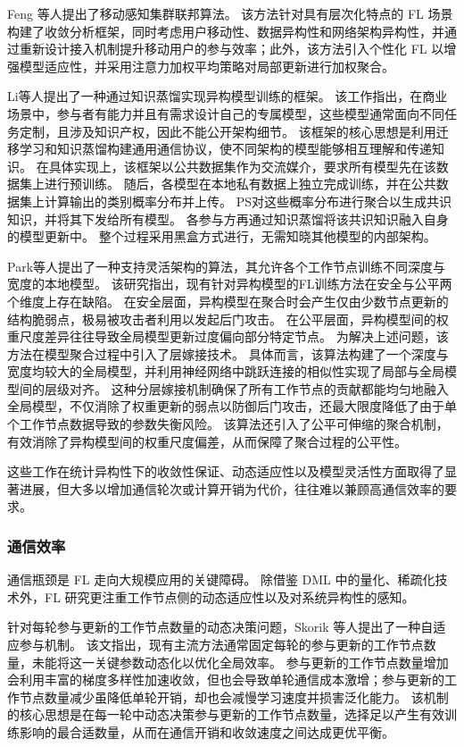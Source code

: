 \documentclass[master, vlined]{DissertUESTC}
\begin{document}
	Feng 等人提出了移动感知集群联邦算法。
	该方法针对具有层次化特点的 FL 场景构建了收敛分析框架，同时考虑用户移动性、数据异构性和网络架构异构性，并通过重新设计接入机制提升移动用户的参与效率；此外，该方法引入个性化 FL 以增强模型适应性，并采用注意力加权平均策略对局部更新进行加权聚合。

	Li等人提出了一种通过知识蒸馏实现异构模型训练的框架。
	该工作指出，在商业场景中，参与者有能力并且有需求设计自己的专属模型，这些模型通常面向不同任务定制，且涉及知识产权，因此不能公开架构细节。
	该框架的核心思想是利用迁移学习和知识蒸馏构建通用通信协议，使不同架构的模型能够相互理解和传递知识。
	在具体实现上，该框架以公共数据集作为交流媒介，要求所有模型先在该数据集上进行预训练。
	随后，各模型在本地私有数据上独立完成训练，并在公共数据集上计算输出的类别概率分布并上传。
	PS对这些概率分布进行聚合以生成共识知识，并将其下发给所有模型。
	各参与方再通过知识蒸馏将该共识知识融入自身的模型更新中。
	整个过程采用黑盒方式进行，无需知晓其他模型的内部架构。

	Park等人提出了一种支持灵活架构的算法，其允许各个工作节点训练不同深度与宽度的本地模型。
	该研究指出，现有针对异构模型的FL训练方法在安全与公平两个维度上存在缺陷。
	在安全层面，异构模型在聚合时会产生仅由少数节点更新的结构脆弱点，极易被攻击者利用以发起后门攻击。
	在公平层面，异构模型间的权重尺度差异往往导致全局模型更新过度偏向部分特定节点。
	为解决上述问题，该方法在模型聚合过程中引入了层嫁接技术。
	具体而言，该算法构建了一个深度与宽度均较大的全局模型，并利用神经网络中跳跃连接的相似性实现了局部与全局模型间的层级对齐。
	这种分层嫁接机制确保了所有工作节点的贡献都能均匀地融入全局模型，不仅消除了权重更新的弱点以防御后门攻击，还最大限度降低了由于单个工作节点数据导致的参数失衡风险。
	该算法还引入了公平可伸缩的聚合机制，有效消除了异构模型间的权重尺度偏差，从而保障了聚合过程的公平性。

	这些工作在统计异构性下的收敛性保证、动态适应性以及模型灵活性方面取得了显著进展，但大多以增加通信轮次或计算开销为代价，往往难以兼顾高通信效率的要求。

	\subsubsection{通信效率}

	通信瓶颈是 FL 走向大规模应用的关键障碍。
	除借鉴 DML 中的量化、稀疏化技术外，FL 研究更注重工作节点侧的动态适应性以及对系统异构性的感知。

	针对每轮参与更新的工作节点数量的动态决策问题，Skorik 等人提出了一种自适应参与机制。
	该文指出，现有主流方法通常固定每轮的参与更新的工作节点数量，未能将这一关键参数动态化以优化全局效率。
	参与更新的工作节点数量增加会利用丰富的梯度多样性加速收敛，但也会导致单轮通信成本激增；参与更新的工作节点数量减少虽降低单轮开销，却也会减慢学习速度并损害泛化能力。
	该机制的核心思想是在每一轮中动态决策参与更新的工作节点数量，选择足以产生有效训练影响的最合适数量，从而在通信开销和收敛速度之间达成更优平衡。
\end{document}
